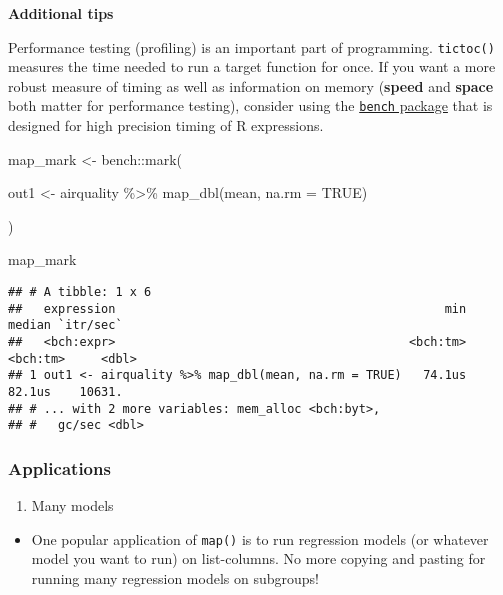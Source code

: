 \documentclass[
]{book}
\newenvironment{Shaded}{\begin{snugshade}}{\end{snugshade}}
\newcommand{\AttributeTok}[1]{\textcolor[rgb]{0.77,0.63,0.00}{#1}}
\newcommand{\ConstantTok}[1]{\textcolor[rgb]{0.00,0.00,0.00}{#1}}
\newcommand{\FunctionTok}[1]{\textcolor[rgb]{0.00,0.00,0.00}{#1}}
\newcommand{\NormalTok}[1]{#1}
\newcommand{\OtherTok}[1]{\textcolor[rgb]{0.56,0.35,0.01}{#1}}
\newcommand{\SpecialCharTok}[1]{\textcolor[rgb]{0.00,0.00,0.00}{#1}}
\providecommand{\tightlist}{%
  \setlength{\itemsep}{0pt}\setlength{\parskip}{0pt}}
\begin{document}
\textbf{Additional tips}

Performance testing (profiling) is an important part of programming. \texttt{tictoc()} measures the time needed to run a target function for once. If you want a more robust measure of timing as well as information on memory (\textbf{speed} and \textbf{space} both matter for performance testing), consider using the \href{https://github.com/r-lib/bench}{\texttt{bench} package} that is designed for high precision timing of R expressions.

\begin{Shaded}
\begin{Highlighting}[]
\NormalTok{map\_mark }\OtherTok{\textless{}{-}}\NormalTok{ bench}\SpecialCharTok{::}\FunctionTok{mark}\NormalTok{(}

\NormalTok{  out1 }\OtherTok{\textless{}{-}}\NormalTok{ airquality }\SpecialCharTok{\%\textgreater{}\%} \FunctionTok{map\_dbl}\NormalTok{(mean, }\AttributeTok{na.rm =} \ConstantTok{TRUE}\NormalTok{)}

\NormalTok{  )}

\NormalTok{map\_mark}
\end{Highlighting}
\end{Shaded}

\begin{verbatim}
## # A tibble: 1 x 6
##   expression                                              min   median `itr/sec`
##   <bch:expr>                                         <bch:tm> <bch:tm>     <dbl>
## 1 out1 <- airquality %>% map_dbl(mean, na.rm = TRUE)   74.1us   82.1us    10631.
## # ... with 2 more variables: mem_alloc <bch:byt>,
## #   gc/sec <dbl>
\end{verbatim}

\hypertarget{applications}{%
\subsubsection{Applications}\label{applications}}

\begin{enumerate}
\def\labelenumi{\arabic{enumi}.}
\tightlist
\item
  Many models
\end{enumerate}

\begin{itemize}
\tightlist
\item
  One popular application of \texttt{map()} is to run regression models (or whatever model you want to run) on list-columns. No more copying and pasting for running many regression models on subgroups!
\end{itemize}
\end{document}
